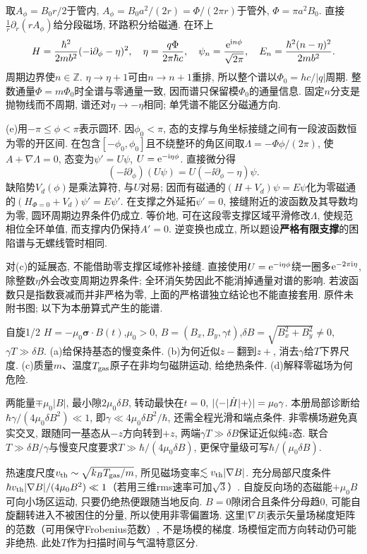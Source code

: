 \begin{solution}
取$A_\phi=B_0r/2$于管内, $A_\phi=B_0a^2/(2r)=\Phi/(2\pi r)$于管外, $\Phi=\pi a^2B_0$. 直接$\frac1r\partial_r(rA_\phi)$给分段磁场, 环路积分给磁通. 在环上
\[
H=\frac{\hbar^2}{2mb^2}(-\mathrm i\partial_\phi-\eta)^2,\quad
\eta=\frac{q\Phi}{2\pi\hbar c},\quad
\psi_n=\frac{\mathrm e^{\mathrm i n\phi}}{\sqrt{2\pi}},\quad
E_n=\frac{\hbar^2(n-\eta)^2}{2mb^2}.
\]
周期边界使$n\in\mathbb Z$. $\eta\to\eta+1$可由$n\to n+1$重排, 所以整个谱以$\Phi_0=hc/|q|$周期. 整数通量$\Phi=m\Phi_0$时全谱与零通量一致, 因而谱只保留模$\Phi_0$的通量信息. 固定$n$分支是抛物线而不周期, 谱还对$\eta\to-\eta$相同; 单凭谱不能区分磁通方向.

(e)用$-\pi\le\phi<\pi$表示圆环. 因$\phi_0<\pi$, 态的支撑与角坐标接缝之间有一段波函数恒为零的开区间. 在包含$[-\phi_0,\phi_0]$且不绕整环的角区间取$\Lambda=-\Phi\phi/(2\pi)$, 使$A+\nabla\Lambda=0$, 态变为$\psi'=U\psi$, $U=\mathrm e^{-\mathrm i\eta\phi}$. 直接微分得
\[
(-\ii\partial_\phi)(U\psi)=U(-\ii\partial_\phi-\eta)\psi.
\]
缺陷势$V_d(\phi)$是乘法算符, 与$U$对易; 因而有磁通的$(H+V_d)\psi=E\psi$化为零磁通的$(H_{\Phi=0}+V_d)\psi'=E\psi'$. 在支撑之外延拓$\psi'=0$, 接缝附近的波函数及其导数均为零, 圆环周期边界条件仍成立. 等价地, 可在这段零支撑区域平滑修改$\Lambda$, 使规范相位全环单值, 而支撑内仍保持$A'=0$. 逆变换也成立, 所以题设\textbf{严格有限支撑}的困陷谱与无螺线管时相同.

对(c)的延展态, 不能借助零支撑区域修补接缝. 直接使用$U=\mathrm e^{-\mathrm i\eta\phi}$绕一圈多$\mathrm e^{-2\pi\mathrm i\eta}$, 除整数$\eta$外会改变周期边界条件; 全环消矢势因此不能消掉通量对谱的影响. 若波函数只是指数衰减而并非严格为零, 上面的严格谱独立结论也不能直接套用. 原件未附书图; 以下为本册算式产生的能谱.

\end{solution}
\begin{exercise}
自旋1/2 $H=-\mu_0\boldsymbol\sigma\cdot B(t)$,$\mu_0>0$, $B=(B_x,B_y,\gamma t)$,$\delta B=\sqrt{B_x^2+B_y^2}\ne0$, $\gamma T\gg\delta B$. (a)给保持基态的慢变条件. (b)为何近似$z-$翻到$z+$, 消去$\gamma$给$T$下界尺度. (c)质量$m$、温度$T_{\rm gas}$原子在非均匀磁阱运动, 给绝热条件. (d)解释零磁场为何危险.
\end{exercise}
\begin{solution}
两能量$\mp\mu_0|B|$, 最小隙$2\mu_0\delta B$, 转动最快在$t=0$, $|\langle -\rvert\dot H\lvert +\rangle|=\mu_0\gamma$. 本册局部诊断给$\hbar\gamma/(4\mu_0\delta B^2)\ll1$, 即$\gamma\ll4\mu_0\delta B^2/\hbar$, 还需全程光滑和端点条件. 非零横场避免真实交叉, 跟随同一基态从$-z$方向转到$+z$, 两端$\gamma T\gg\delta B$保证近似纯$z$态. 联合$T\gg\delta B/\gamma$与慢变尺度要求$T\gg\hbar/(4\mu_0\delta B)$, 更保守量级可写$\hbar/(\mu_0\delta B)$.

热速度尺度$v_{\rm th}\sim\sqrt{k_BT_{\rm gas}/m}$, 所见磁场变率$\lesssim v_{\rm th}|\nabla B|$. 充分局部尺度条件$\hbar v_{\rm th}|\nabla B|/(4\mu_0B^2)\ll1$（若用三维rms速率可加$\sqrt3$）. 自旋反向场的态磁能$+\mu_0B$可向小场区运动, 只要仍绝热便跟随当地反向. $B=0$隙闭合且条件分母趋0, 可能自旋翻转进入不被困住的分量, 所以使用非零偏置场. 这里$|\nabla B|$表示矢量场梯度矩阵的范数（可用保守Frobenius范数）, 不是场模的梯度. 场模恒定而方向转动仍可能非绝热. 此处$T$作为扫描时间与气温特意区分.
\end{solution}
